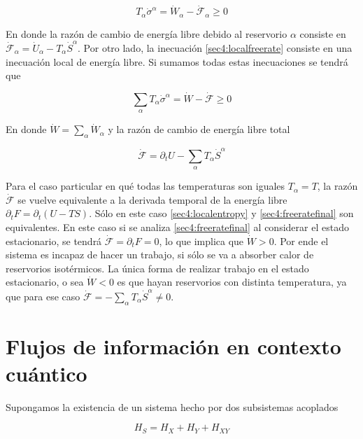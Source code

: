 \begin{equation}
    T_{\alpha} \dot{\sigma}^{\alpha} = \dot{W}_{\alpha} - \dot{\mathcal{F}}_{\alpha} \geq 0
\label{sec4:localfreerate}
\end{equation}

En donde la razón de cambio de energía libre debido al reservorio $\alpha$ consiste en $\dot{\mathcal{F}}_{\alpha} = \dot{U}_{\alpha} - T_{\alpha}\dot{S}^{\alpha}$. Por otro lado, la inecuación \ref{sec4:localfreerate} consiste en una inecuación local de energía libre. Si sumamos todas estas inecuaciones se tendrá que

\begin{equation}
    \sum_{\alpha}T_{\alpha} \dot{\sigma}^{\alpha} = \dot{W} - \dot{\mathcal{F}} \geq 0
\label{sec4:freeratefinal}
\end{equation}

En donde $\dot{W} = \sum_{\alpha}\dot{W}_{\alpha}$ y la razón de cambio de energía libre total

\begin{equation*}
    \dot{\mathcal{F}} = \partial_{t}U - \sum_{\alpha}T_{\alpha} \dot{S}^{\alpha}
\end{equation*}

Para el caso particular en qué todas las temperaturas son iguales $T_{\alpha} = T$, la razón $\dot{\mathcal{F}}$ se vuelve equivalente a la derivada temporal de la energía libre $\partial_{t}F = \partial_{t}(U-TS)$. Sólo en este caso \ref{sec4:localentropy} y \ref{sec4:freeratefinal} son equivalentes. En este caso si se analiza \ref{sec4:freeratefinal} al considerar el estado estacionario, se tendrá $\dot{\mathcal{F}} = \partial_{t}F = 0$, lo que implica que $\dot{W}>0$. Por ende el sistema es incapaz de hacer un trabajo, si sólo se va a absorber calor de reservorios isotérmicos. La única forma de realizar trabajo en el estado estacionario, o sea $\dot{W}<0$ es que hayan reservorios con distinta temperatura, ya que para ese caso $\dot{\mathcal{F}} = - \sum_{\alpha} T_{\alpha} \dot{S}^{\alpha} \neq 0$.   

\section{Flujos de información en contexto cuántico}
Supongamos la existencia de un sistema hecho por dos subsistemas acoplados

\begin{equation*}
    H_{S} = H_{X} + H_{Y} + H_{XY} 
\end{equation*}

